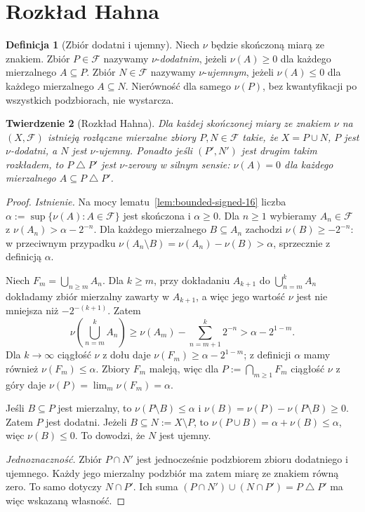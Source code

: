\documentclass[11pt,a4paper,oneside]{book}
\numberwithin{equation}{chapter}
\theoremstyle{plain}
\newtheorem{twierdzenie}{Twierdzenie}[chapter]
\theoremstyle{definition}
\newtheorem{definicja}[twierdzenie]{Definicja}
\theoremstyle{remark}
\begin{document}
\section{Rozkład Hahna}
\begin{definicja}[Zbiór dodatni i ujemny]
\label{def:positive-negative-16}
Niech $\nu$ będzie skończoną miarą ze znakiem.
Zbiór $P\in\mathcal F$ nazywamy $\nu$-\emph{dodatnim},
jeżeli $\nu(A)\ge0$ dla każdego mierzalnego $A\subseteq P$.
Zbiór $N\in\mathcal F$ nazywamy $\nu$-\emph{ujemnym},
jeżeli $\nu(A)\le0$ dla każdego mierzalnego $A\subseteq N$.
Nierówność dla samego $\nu(P)$, bez kwantyfikacji po
wszystkich podzbiorach, nie wystarcza.
\end{definicja}

\begin{twierdzenie}[Rozkład Hahna]
\label{thm:hahn-16}
Dla każdej skończonej miary ze znakiem $\nu$ na
$(X,\mathcal F)$ istnieją rozłączne mierzalne zbiory
$P,N\in\mathcal F$ takie, że $X=P\cup N$,
$P$ jest $\nu$-dodatni, a $N$ jest $\nu$-ujemny.
Ponadto jeśli $(P',N')$ jest drugim takim rozkładem,
to $P\mathbin\triangle P'$ jest $\nu$-zerowy
w silnym sensie: $\nu(A)=0$ dla każdego mierzalnego
$A\subseteq P\mathbin\triangle P'$.
\end{twierdzenie}
\begin{proof}
\emph{Istnienie.} Na mocy lematu~\ref{lem:bounded-signed-16}
liczba $\alpha:=\sup\{\nu(A):A\in\mathcal F\}$ jest
skończona i $\alpha\ge0$. Dla $n\ge1$ wybieramy
$A_n\in\mathcal F$ z $\nu(A_n)>\alpha-2^{-n}$.
Dla każdego mierzalnego $B\subseteq A_n$ zachodzi
$\nu(B)\ge-2^{-n}$: w przeciwnym przypadku
$\nu(A_n\setminus B)=\nu(A_n)-\nu(B)>\alpha$,
sprzecznie z definicją $\alpha$.

Niech $F_m=\bigcup_{n\ge m}A_n$. Dla $k\ge m$,
przy dokładaniu $A_{k+1}$ do $\bigcup_{n=m}^kA_n$
dokładamy zbiór mierzalny zawarty w $A_{k+1}$,
a więc jego wartość $\nu$ jest nie mniejsza
niż $-2^{-(k+1)}$. Zatem
\[
\nu\left(\bigcup_{n=m}^kA_n\right)
\ge\nu(A_m)-\sum_{n=m+1}^k2^{-n}
>\alpha-2^{1-m}.
\]
Dla $k\to\infty$ ciągłość $\nu$ z dołu daje
$\nu(F_m)\ge\alpha-2^{1-m}$; z definicji
$\alpha$ mamy również $\nu(F_m)\le\alpha$.
Zbiory $F_m$ maleją, więc dla
$P:=\bigcap_{m\ge1}F_m$ ciągłość $\nu$ z góry daje
$\nu(P)=\lim_m\nu(F_m)=\alpha$.

Jeśli $B\subseteq P$ jest mierzalny, to
$\nu(P\setminus B)\le\alpha$ i
$\nu(B)=\nu(P)-\nu(P\setminus B)\ge0$.
Zatem $P$ jest dodatni. Jeżeli $B\subseteq N:=X\setminus P$,
to $\nu(P\cup B)=\alpha+\nu(B)\le\alpha$,
więc $\nu(B)\le0$. To dowodzi, że $N$ jest ujemny.

\emph{Jednoznaczność.} Zbiór $P\cap N'$ jest jednocześnie
podzbiorem zbioru dodatniego i ujemnego. Każdy jego
mierzalny podzbiór ma zatem miarę ze znakiem równą zero.
To samo dotyczy $N\cap P'$. Ich suma
$(P\cap N')\cup(N\cap P')=P\mathbin\triangle P'$ ma
więc wskazaną własność.
\end{proof}
\end{document}
